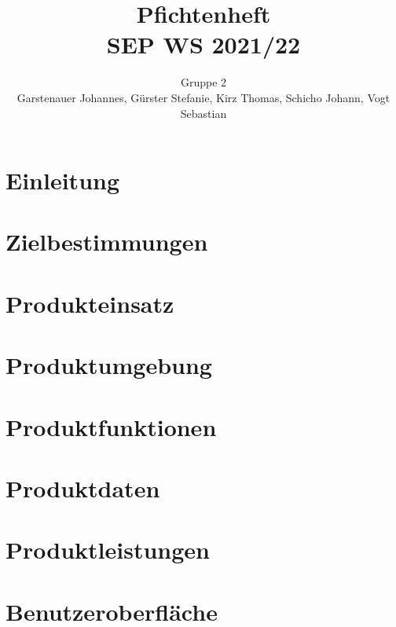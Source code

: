\documentclass[a4paper,11pt,parskip=half-]{scrartcl}
\newcommand{\doubletitle}[2]{\title{#1 \\ [1ex] \normalsize #2}}
\newcommand{\extauthor}[2]{\author{#1 \\ \normalsize #2}}
\begin{document}
	\doubletitle{Pfichtenheft}{SEP WS 2021/22}
	
	\extauthor{Gruppe 2}{Garstenauer Johannes, Gürster Stefanie, Kirz Thomas, Schicho Johann, Vogt Sebastian}
	
	
	\maketitle
	\tableofcontents
	\listoftodos
	
	
	\newpage
	
	\section{Einleitung}
	
	
	\section{Zielbestimmungen}
	
	
	\section{Produkteinsatz}
	
	
	\section{Produktumgebung}
	
	
	\section{Produktfunktionen}
	
	
	\section{Produktdaten}
	
	
	\section{Produktleistungen}
	
	
	\section{Benutzeroberfläche}
	
	
\end{document}

